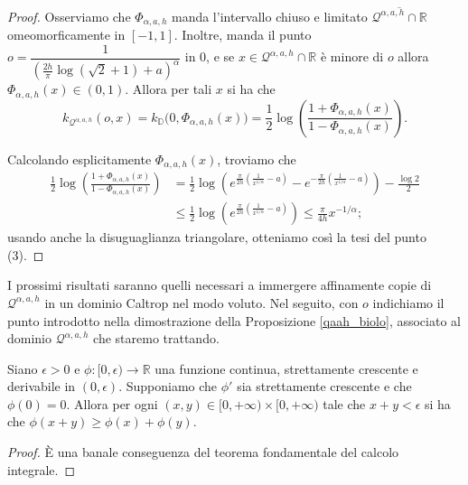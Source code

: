 \begin{proof}
    Osserviamo che $\Phi_{\alpha,a,h}$ manda l'intervallo chiuso e limitato $\overline{\mathcal{Q}^{\alpha,a,h}\cap\mathbb{R}}$ omeomorficamente in $[-1,1]$. Inoltre, manda il punto $o=\dfrac{1}{\left(\frac{2h}{\pi}\log(\sqrt{2}+1)+a\right)^\alpha}$ in $0$, e se $x\in\mathcal{Q}^{\alpha,a,h}\cap\mathbb{R}$ è minore di $o$ allora $\Phi_{\alpha,a,h}(x)\in(0,1)$. Allora per tali $x$ si ha che
    $$k_{\mathcal{Q}^{\alpha,a,h}}(o,x)=k_{\mathbb{D}}\big(0,\Phi_{\alpha,a,h}(x)\big)=\frac{1}{2}\log\left(\frac{1+\Phi_{\alpha,a,h}(x)}{1-\Phi_{\alpha,a,h}(x)}\right).$$

    Calcolando esplicitamente $\Phi_{\alpha,a,h}(x)$, troviamo che
    \begin{align*}
        \frac{1}{2}\log\left(\frac{1+\Phi_{\alpha,a,h}(x)}{1-\Phi_{\alpha,a,h}(x)}\right)&=\frac{1}{2}\log\left(e^{\frac{\pi}{2h}\left(\frac{1}{x^{1/\alpha}}-a\right)}-e^{-\frac{\pi}{2h}\left(\frac{1}{x^{1/\alpha}}-a\right)}\right)-\frac{\log{2}}{2}\\
        &\le \frac{1}{2}\log\left(e^{\frac{\pi}{2h}\left(\frac{1}{x^{1/\alpha}}-a\right)}\right) \le \frac{\pi}{4h}x^{-1/\alpha};
    \end{align*}
    usando anche la disuguaglianza triangolare, otteniamo così la tesi del punto (3).
\end{proof}

I prossimi risultati saranno quelli necessari a immergere affinamente copie di $\mathcal{Q}^{\alpha,a,h}$ in un dominio Caltrop nel modo voluto. Nel seguito, con $o$ indichiamo il punto introdotto nella dimostrazione della Proposizione \ref{qaah_biolo}, associato al dominio $\mathcal{Q}^{\alpha,a,h}$ che staremo trattando.

\begin{lm} \label{superadd}
    Siano $\epsilon>0$ e $\phi:[0,\epsilon)\longrightarrow\mathbb{R}$ una funzione continua, strettamente crescente e derivabile in $(0,\epsilon)$. Supponiamo che $\phi'$ sia strettamente crescente e che $\phi(0)=0$. Allora per ogni $(x,y)\in[0,+\infty)\times[0,+\infty)$ tale che $x+y<\epsilon$ si ha che $\phi(x+y) \ge \phi(x)+\phi(y)$.
\end{lm}

\begin{proof}
    È una banale conseguenza del teorema fondamentale del calcolo integrale.
\end{proof}

